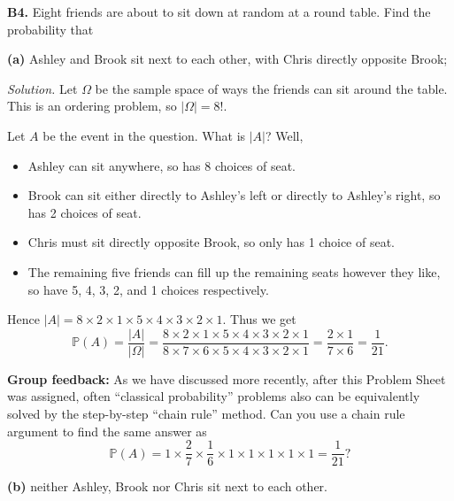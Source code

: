 \documentclass[
  a4paper,
]{book}
\providecommand{\tightlist}{%
  \setlength{\itemsep}{0pt}\setlength{\parskip}{0pt}}
\theoremstyle{definition}
\theoremstyle{definition}
\theoremstyle{definition}
\theoremstyle{definition}
\theoremstyle{remark}
\begin{document}
\textbf{B4.} Eight friends are about to sit down at random at a round table. Find the probability that

\textbf{(a)} Ashley and Brook sit next to each other, with Chris directly opposite Brook;

\begin{myanswers}
\emph{Solution.}
Let \(\Omega\) be the sample space of ways the friends can sit around the table. This is an ordering problem, so \(|\Omega| = 8!\).

Let \(A\) be the event in the question. What is \(|A|\)? Well,

\begin{itemize}
\tightlist
\item
  Ashley can sit anywhere, so has 8 choices of seat.
\item
  Brook can sit either directly to Ashley's left or directly to Ashley's right, so has 2 choices of seat.
\item
  Chris must sit directly opposite Brook, so only has 1 choice of seat.
\item
  The remaining five friends can fill up the remaining seats however they like, so have 5, 4, 3, 2, and 1 choices respectively.
\end{itemize}

Hence \(|A| = 8 \times 2 \times 1 \times 5 \times 4 \times 3 \times 2 \times 1\). Thus we get
\[ \mathbb P(A) = \frac{|A|}{|\Omega|} = \frac{8 \times 2 \times 1 \times 5 \times 4 \times 3 \times 2 \times 1}{8 \times 7 \times 6 \times 5 \times 4 \times 3 \times 2 \times 1} = \frac{2 \times 1}{7 \times 6} = \frac{1}{21} . \]

\textbf{Group feedback:} As we have discussed more recently, after this Problem Sheet was assigned, often ``classical probability'' problems also can be equivalently solved by the step-by-step ``chain rule'' method. Can you use a chain rule argument to find the same answer as
\[ \mathbb P(A) = 1 \times \frac27 \times \frac16 \times 1 \times 1 \times 1 \times 1 \times 1 = \frac{1}{21} ? \]

\end{myanswers}

\textbf{(b)} neither Ashley, Brook nor Chris sit next to each other.
\end{document}
